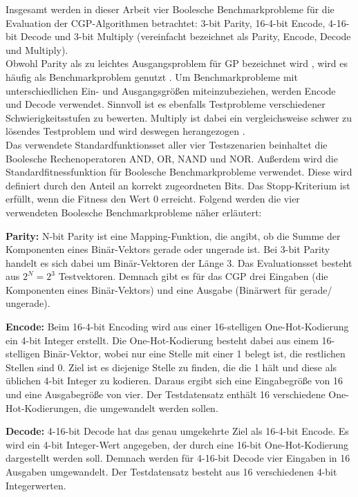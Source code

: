 Insgesamt werden in dieser Arbeit vier Boolesche Benchmarkprobleme für die Evaluation der CGP-Algorithmen betrachtet: 3-bit Parity, 16-4-bit Encode, 4-16-bit Decode und 3-bit Multiply (vereinfacht bezeichnet als Parity, Encode, Decode und Multiply).\\
Obwohl Parity als zu leichtes Ausgangsproblem für GP bezeichnet wird \cite{white_better_2013}, wird es häufig als Benchmarkproblem genutzt \cite{yu_neutrality_2001, kaufmann_kalkreuth_2017, kaufmann_kalkreuth_2020}.
Um Benchmarkprobleme mit unterschiedlichen Ein- und Ausgangsgrößen miteinzubeziehen, werden Encode und Decode verwendet.
Sinnvoll ist es ebenfalls Testprobleme verschiedener Schwierigkeitsstufen zu bewerten.
Multiply ist dabei ein vergleichsweise schwer zu lösendes Testproblem und wird deswegen herangezogen \cite{walker_2008}.\\

Das verwendete Standardfunktionsset aller vier Testszenarien beinhaltet die Boolesche Rechenoperatoren AND, OR, NAND und NOR.
Außerdem wird die Standardfitnessfunktion für Boolesche Benchmarkprobleme verwendet.
Diese wird definiert durch den Anteil an korrekt zugeordneten Bits. \cite{cui_equidistant_2023}
Das Stopp-Kriterium ist erfüllt, wenn die Fitness den Wert 0 erreicht.
Folgend werden die vier verwendeten Boolesche Benchmarkprobleme näher erläutert:

\textbf{Parity:} N-bit Parity ist eine Mapping-Funktion, die angibt, ob die Summe der Komponenten eines Binär-Vektors gerade oder ungerade ist.
Bei 3-bit Parity handelt es sich dabei um Binär-Vektoren der Länge 3.
Das Evaluationsset besteht aus $2^N=2^3$ Testvektoren. \cite{hohil_1999}
Demnach gibt es für das CGP drei Eingaben (die Komponenten eines Binär-Vektors) und eine Ausgabe (Binärwert für \glqq gerade\grqq\space / \glqq ungerade\grqq).

\textbf{Encode:} Beim 16-4-bit Encoding wird aus einer 16-stelligen One-Hot-Kodierung ein 4-bit Integer erstellt.
Die One-Hot-Kodierung besteht dabei aus einem 16-stelligen Binär-Vektor, wobei nur eine Stelle mit einer 1 belegt ist, die restlichen Stellen sind 0.
Ziel ist es diejenige Stelle zu finden, die die 1 hält und diese als üblichen 4-bit Integer zu kodieren. \cite{cui_weighted_mutation, goldman_2015}
Daraus ergibt sich eine Eingabegröße von 16 und eine Ausgabegröße von vier.
Der Testdatensatz enthält 16 verschiedene One-Hot-Kodierungen, die umgewandelt werden sollen.

\textbf{Decode:} 4-16-bit Decode hat das genau umgekehrte Ziel als 16-4-bit Encode.
Es wird ein 4-bit Integer-Wert angegeben, der durch eine 16-bit One-Hot-Kodierung dargestellt werden soll. \cite{cui_weighted_mutation}
Demnach werden für 4-16-bit Decode vier Eingaben in 16 Ausgaben umgewandelt.
Der Testdatensatz besteht aus 16 verschiedenen 4-bit Integerwerten.

